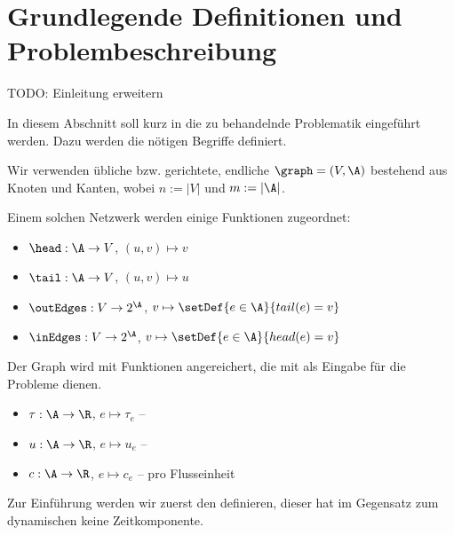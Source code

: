 
\section{Grundlegende Definitionen und Problembeschreibung}\label{sec:problem}

TODO: Einleitung erweitern

In diesem Abschnitt soll kurz in die zu behandelnde Problematik eingeführt
werden. Dazu werden die nötigen Begriffe definiert.

\begin{definition}
    Wir verwenden übliche  bzw. gerichtete, endliche 
    $\graph = (V, \A)$ bestehend aus Knoten und Kanten,
    wobei $n := |V|$ und $m := |\A|$.
    
    Einem solchen Netzwerk werden einige Funktionen zugeordnet:
    \begin{itemize}
        \item $\head : \A \rightarrow V$, $(u,v) \mapsto v$
        \item $\tail : \A \rightarrow V$, $(u,v) \mapsto u$
        \item $\outEdges : V \rightarrow 2^\A$,
            $v \mapsto \setDef{e \in \A}{tail(e) = v}$
        \item $\inEdges : V \rightarrow 2^\A$,
            $v \mapsto \setDef{e \in \A}{head(e) = v}$
    \end{itemize}
    
    Der Graph wird mit Funktionen angereichert, die mit als Eingabe
    für die Probleme dienen.
    \begin{itemize}
        \item $\tau : \A \rightarrow \R$, $e \mapsto \tau_e$ -- 
        \item $u : \A \rightarrow \R$, $e \mapsto u_e$ -- 
        \item $c : \A \rightarrow \R$, $e \mapsto c_e$
            --  pro Flusseinheit
    \end{itemize}
\end{definition}

Zur Einführung werden wir zuerst den  definieren, dieser
hat im Gegensatz zum dynamischen keine Zeitkomponente.

